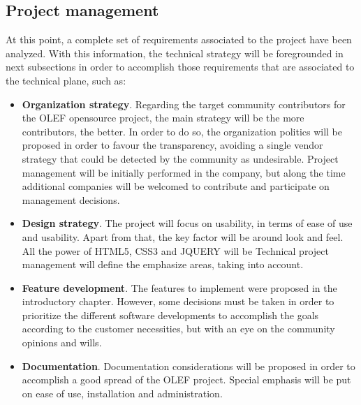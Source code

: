\documentclass[11pt]{article}
\begin{document}
\subsection{Project management}
At this point, a complete set of requirements associated to the project have been analyzed. With this information, the technical strategy will be foregrounded in next subsections in order to accomplish those requirements that are associated to the technical plane, such as:
\begin{itemize}\itemsep0pt
\item{\textbf{Organization strategy}}. Regarding the target community contributors for the OLEF opensource project, the main strategy will be the more contributors, the better. In order to do so, the organization politics will be proposed in order to favour the transparency, avoiding a single vendor strategy that could be detected by the community as undesirable. Project management will be initially performed in the company, but along the time additional companies will be welcomed to contribute and participate on management decisions.
\item{\textbf{Design strategy}}. The project will focus on usability, in terms of ease of use and usability. Apart from that, the key factor will be around look and feel. All the power of HTML5, CSS3 and JQUERY will be  Technical project management will define the emphasize areas, taking into account.
\item{\textbf{Feature development}}. The features to implement were proposed in the introductory chapter. However, some decisions must be taken in order to prioritize the different software developments to accomplish the goals according to the customer necessities, but with an eye on the community opinions and wills.
\item{\textbf{Documentation}}. Documentation considerations will be proposed in order to accomplish a good spread of the OLEF project. Special emphasis will be put on ease of use, installation and administration. 
\end{itemize}
\end{document}
